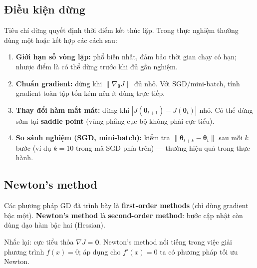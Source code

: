 \subsection{Điều kiện dừng}
\label{subsec:stopping-criteria}

\begin{ynghia}[title={Khi nào dừng thuật toán?}]
Tiêu chí dừng quyết định thời điểm kết thúc lặp. Trong thực nghiệm thường dùng một hoặc kết hợp các cách sau:

\begin{enumerate}
 \item \textbf{Giới hạn số vòng lặp:} phổ biến nhất, đảm bảo thời gian chạy có hạn; nhược điểm là có thể dừng trước khi đủ gần nghiệm.
 \item \textbf{Chuẩn gradient:} dừng khi $\|\nabla_{\boldsymbol{\theta}} J\|$ đủ nhỏ. Với SGD/mini-batch, tính gradient toàn tập tốn kém nên ít dùng trực tiếp.
 \item \textbf{Thay đổi hàm mất mát:} dừng khi $|J(\boldsymbol{\theta}_{t+1}) - J(\boldsymbol{\theta}_t)|$ nhỏ. Có thể dừng sớm tại \textbf{saddle point} (vùng phẳng cục bộ không phải cực tiểu).
 \item \textbf{So sánh nghiệm (SGD, mini-batch):} kiểm tra $\|\boldsymbol{\theta}_{t+k} - \boldsymbol{\theta}_t\|$ sau mỗi $k$ bước (ví dụ $k = 10$ trong mã SGD phía trên) --- thường hiệu quả trong thực hành.
\end{enumerate}
\end{ynghia}

\subsection{Newton's method}
\label{subsec:newton}

\begin{ynghia}[title={Phương pháp bậc nhất và bậc hai}]
Các phương pháp GD đã trình bày là \textbf{first-order methods} (chỉ dùng gradient bậc một). \textbf{Newton's method} là \textbf{second-order method}: bước cập nhật còn dùng đạo hàm bậc hai (Hessian).

Nhắc lại: cực tiểu thỏa $\nabla J = \mathbf{0}$. Newton's method nổi tiếng trong việc giải phương trình $f(x) = 0$; áp dụng cho $f'(x) = 0$ ta có phương pháp tối ưu Newton.
\end{ynghia}

